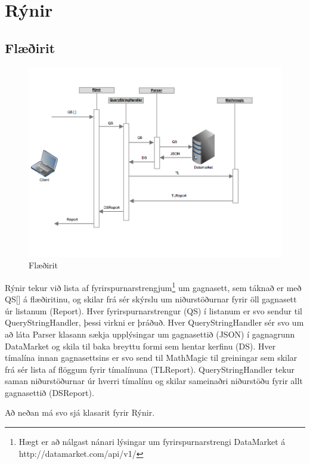 \documentclass{article}
\begin{document}
\section{Rýnir}
\subsection{Flæðirit}
\label{sec:flow_chart}

\begin{figure}[H]
  \centering
  \includegraphics[width=.95\textwidth]{rynir_sequence-2.png} 
  \caption{Flæðirit} 
\end{figure}
Rýnir tekur við lista af fyrirspurnarstrengjum\footnote[1]{Hægt er að nálgast nánari lýsingar um fyrirspurnarstrengi DataMarket á http://datamarket.com/api/v1/} 
um gagnasett, sem táknað er með QS[] á flæðiritinu, og skilar frá sér skýrslu um niðurstöðurnar fyrir öll
gagnasett úr listanum (Report). Hver fyrirspurnarstrengur (QS) í listanum er svo
sendur til QueryStringHandler, þessi virkni er þráðuð. Hver
QueryStringHandler sér svo um að láta Parser klasann sækja upplýsingar um
gagnasettið (JSON) í gagnagrunn DataMarket og skila til baka breyttu formi sem
hentar kerfinu (DS). Hver tímalína innan gagnasettsins er svo send til MathMagic
til greiningar sem skilar frá sér lista af flöggum fyrir tímalínuna (TLReport).
QueryStringHandler tekur saman niðurstöðurnar úr hverri tímalínu og skilar
sameinaðri niðurstöðu fyrir allt gagnasettið (DSReport).

Að neðan má svo sjá klasarit fyrir Rýnir.
\end{document}
